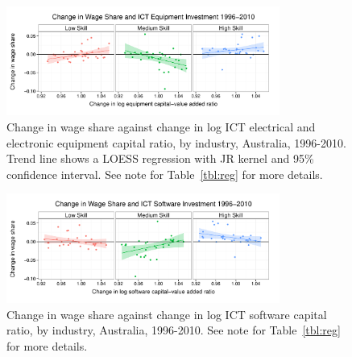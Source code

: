 \documentclass[a4paper]{article}
\begin{document}
\begin{figure}
  \centering
  \includegraphics[width=0.8\textwidth]{../figure/wage_share_equipment_skill.pdf}
  \caption{Change in wage share against change in log ICT electrical and electronic equipment capital ratio, by industry, Australia, 1996-2010.
    Trend line shows a LOESS regression with JR kernel and 95\% confidence interval. See note for Table~\ref{tbl:reg} for more details.
  }
  \label{fig:equip}
\end{figure}

\begin{figure}
  \centering
  \includegraphics[width=0.8\textwidth]{../figure/wage_share_software_skill.pdf}
  \caption{Change in wage share against change in log ICT software capital ratio, by industry, Australia, 1996-2010.
    See note for Table~\ref{tbl:reg} for more details.
  }
  \label{fig:soft}
\end{figure}
\end{document}
